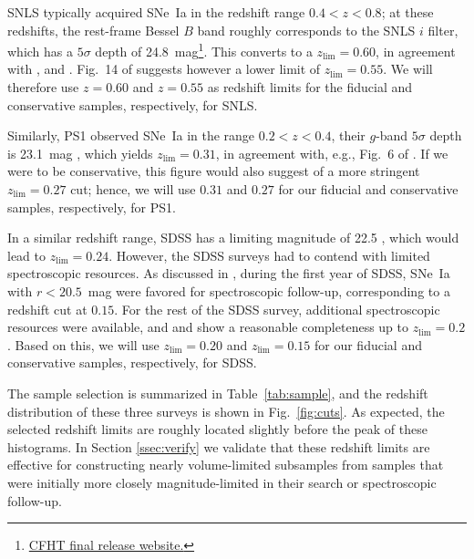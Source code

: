 \documentclass[]{aa}
\begin{document}
SNLS typically acquired SNe~Ia in the redshift range $0.4<z<0.8$; at these
redshifts, the rest-frame Bessel $B$ band roughly corresponds to the SNLS $i$
filter, which has a $5\sigma$ depth of
24.8~mag\footnote{\href{https://www.cfht.hawaii.edu/Science/CFHTLS/cfhtlsfinalreleaseexecsummary.html}{CFHT
final release website.}}. This converts to a $z_{\lim}=0.60$, in agreement with
\cite{neill2006}, \cite{perrett2010} and \cite{bazin2011}. Fig.~14 of
\citet[][see their Section~5]{perrett2010} suggests however a lower limit of
$z_{\lim}=0.55$. We will therefore use $z=0.60$ and $z=0.55$ as redshift
limits for the fiducial and conservative samples, respectively, for SNLS.

Similarly, PS1 observed SNe~Ia in the range $0.2<z<0.4$, their $g$-band
$5\sigma$ depth is 23.1~mag \citep{rest2014}, which yields $z_{\lim}=0.31$, in
agreement with, e.g., Fig.~6 of \cite{scolnic2018a}. If we were to be
    conservative, this figure would also suggest of a more stringent
$z_{\lim}=0.27$ cut; hence, we will use $0.31$ and $0.27$ for our fiducial and
conservative samples, respectively, for PS1.

In a similar redshift range, SDSS has a limiting magnitude of 22.5
\citep{dilday2008, sako2008}, which would lead to $z_{\lim}=0.24$. However, the
SDSS surveys had to contend with limited spectroscopic resources. As
discussed in \citet[][Section~2]{kessler2009}, during the first year of SDSS,
SNe~Ia with $r<20.5$~mag were favored for spectroscopic follow-up, corresponding
to a redshift cut at $0.15$. For the rest of the SDSS survey, additional
spectroscopic resources were available, and \cite{kessler2009} and
\cite{dilday2008} show a reasonable completeness up to $z_{\lim}=0.2$.
Based on this, we will use $z_{\lim}=0.20$ and $z_{\lim}=0.15$ for our
fiducial and conservative samples, respectively, for SDSS.

The sample selection is summarized in Table~\ref{tab:sample}, and the redshift
distribution of these three surveys is shown in Fig.~\ref{fig:cuts}. As
expected, the selected redshift limits are roughly located slightly
    before the peak of these histograms. In Section \ref{ssec:verify} we
validate that these redshift limits are effective for constructing nearly
volume-limited subsamples from samples that were initially more closely
magnitude-limited in their search or spectroscopic follow-up.
\end{document}
